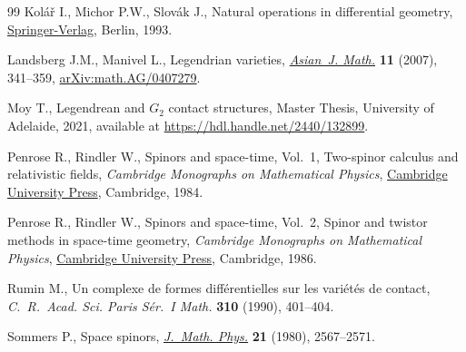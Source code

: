 \documentclass[pdftex]{sigma}%
\numberwithin{equation}{section}
\begin{document}
\begin{thebibliography}{99}
Kol\'a\v{r} I., Michor P.W., Slov\'ak J., Natural operations in differential
 geometry, \href{https://doi.org/10.1007/978-3-662-02950-3}{Springer-Verlag}, Berlin, 1993.

Landsberg J.M., Manivel L., Legendrian varieties, \href{https://doi.org/10.4310/AJM.2007.v11.n3.a1}{\textit{Asian~J. Math.}}
 \textbf{11} (2007), 341--359, \href{https://arxiv.org/abs/math.AG/0407279}{arXiv:math.AG/0407279}.

Moy T., Legendrean and $G_2$ contact structures, {M}aster {T}hesis, University
 of Adelaide, 2021, available at \url{https://hdl.handle.net/2440/132899}.

Penrose R., Rindler W., Spinors and space-time, {V}ol.~1, Two-spinor calculus
 and relativistic fields, \textit{Cambridge Monographs on Mathematical Physics},
 \href{https://doi.org/10.1017/CBO9780511564048}{Cambridge University Press}, Cambridge, 1984.

Penrose R., Rindler W., Spinors and space-time, {V}ol.~2, {S}pinor and twistor
 methods in space-time geometry, \textit{Cambridge Monographs on Mathematical Physics},
 \href{https://doi.org/10.1017/CBO9780511524486}{Cambridge University Press}, Cambridge, 1986.

Rumin M., Un complexe de formes diff\'erentielles sur les vari\'et\'es de
 contact, \textit{C.~R.~Acad. Sci. Paris S\'er.~I Math.} \textbf{310} (1990),
 401--404.

Sommers P., Space spinors, \href{https://doi.org/10.1063/1.524351}{\textit{J.~Math. Phys.}} \textbf{21} (1980),
 2567--2571.

\end{thebibliography}\LastPageEnding
\end{document}

